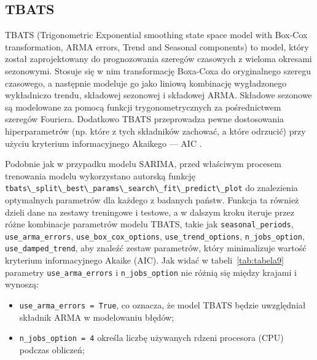 \documentclass[polish, twoside, 12pt, a4paper]{article}
\makeatletter
\theoremstyle{definition}
\theoremstyle{plain}
\theoremstyle{remark}
\renewcommand\footnotesize{%
   \@setfontsize\footnotesize\@ixpt{10}%
   \abovedisplayskip 8\p@ \@plus2\p@ \@minus4\p@
   \abovedisplayshortskip \z@ \@plus\p@
   \belowdisplayshortskip 4\p@ \@plus2\p@ \@minus2\p@
   \def\@listi{\leftmargin\leftmargini
               \topsep 4\p@ \@plus2\p@ \@minus2\p@
               \parsep 2\p@ \@plus\p@ \@minus\p@
               \itemsep \parsep}%
   \belowdisplayskip \abovedisplayskip
}
\newcommand{\code}[1]{\lstinline{#1}}
\makeatother
\begin{document}
%
%
%  
%
%
%
%

\subsection{TBATS}


TBATS (Trigonometric Exponential smoothing state space model with Box-Cox transformation, ARMA errors, Trend and Seasonal components) to model, który został zaprojektowany do prognozowania szeregów czasowych z wieloma okresami sezonowymi. Stosuje się w nim transformację Boxa-Coxa do oryginalnego szeregu czasowego, a następnie modeluje go jako liniową kombinację wygładzonego wykładniczo trendu, składowej sezonowej i składowej ARMA. Składowe sezonowe są modelowane za pomocą funkcji trygonometrycznych za pośrednictwem szeregów Fouriera. Dodatkowo TBATS przeprowadza pewne dostosowania hiperparametrów (np. które z tych składników zachować, a które odrzucić) przy użyciu kryterium informacyjnego Akaikego --- AIC \citep{tbats-doc}.

Podobnie jak w przypadku modelu SARIMA, przed właściwym procesem trenowania modelu wykorzystano autorską funkcję \code{tbats\_split\_best\_params\_search\_fit\_predict\_plot} do znalezienia optymalnych parametrów dla każdego z badanych państw. Funkcja ta również dzieli dane na zestawy treningowe i testowe, a w dalszym kroku iteruje przez różne kombinacje parametrów modelu TBATS, takie jak \code{seasonal_periods}, \code{use_arma_errors}, \code{use_box_cox_options}, \code{use_trend_options}, \code{n_jobs_option}, \code{use_damped_trend}, aby znaleźć zestaw parametrów, który minimalizuje wartość kryterium informacyjnego Akaike (AIC). Jak widać w tabeli~\ref{tab:tabela9} parametry \code{use_arma_errors} i \code{n_jobs_option} nie różnią się między krajami i wynoszą:

\begin{itemize}[noitemsep]
	\item \code{use_arma_errors = True}, co oznacza, że model TBATS będzie uwzględniał składnik ARMA w modelowaniu błędów;
	\item \code{n_jobs_option = 4} określa liczbę używanych rdzeni procesora (CPU) podczas obliczeń;
\end{itemize}
\end{document}
